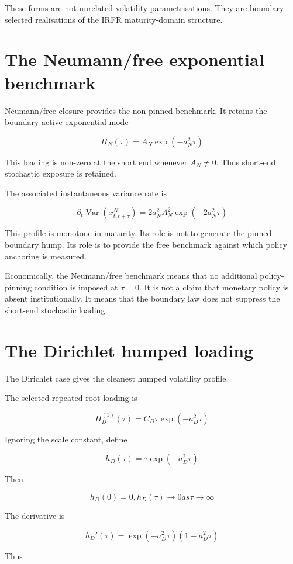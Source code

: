 \documentclass[11pt,oneside]{book}
\begin{document}
These forms are not unrelated volatility parametrisations. They are
boundary-selected realisations of the IRFR maturity-domain structure.

\section{The Neumann/free exponential
benchmark}\label{the-naturalfree-exponential-benchmark}

Neumann/free closure provides the non-pinned benchmark. It retains the
boundary-active exponential mode

\[
H_N(\tau) = A_N \exp(-a_N^2\tau)
\]

This loading is non-zero at the short end whenever $A_N\neq0$. Thus
short-end stochastic exposure is retained.

The associated instantaneous variance rate is

\[
\partial_t  \operatorname{Var}(x^N_{t,t+\tau}) = 2a_N^2 A_N^2 \exp(-2a_N^2\tau)
\]

This profile is monotone in maturity. Its role is not to generate the
pinned-boundary hump. Its role is to provide the free benchmark against
which policy anchoring is measured.

Economically, the Neumann/free benchmark means that no additional
policy-pinning condition is imposed at $\tau=0$. It is not a claim that
monetary policy is absent institutionally. It means that the boundary
law does not suppress the short-end stochastic loading.

\section{The Dirichlet humped
loading}\label{the-dirichlet-humped-loading}

The Dirichlet case gives the cleanest humped volatility profile.

The selected repeated-root loading is

\[
H_D^{(1)}(\tau) = C_D \tau \exp(-a_D^2\tau)
\]

Ignoring the scale constant, define

\[
h_D(\tau) = \tau \exp(-a_D^2\tau)
\]

Then

\[
h_D(0) = 0, h_D(\tau) \to 0 as \tau \to \infty
\]

The derivative is

\[
h_D'(\tau) = \exp(-a_D^2\tau)(1 - a_D^2\tau)
\]

Thus
\end{document}
